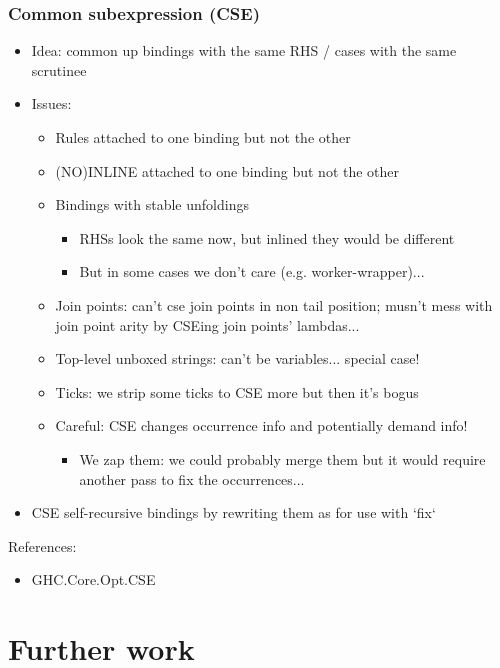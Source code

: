 \documentclass[aspectratio=169]{beamer}
\begin{document}
\begin{frame}
  \frametitle{Common subexpression (CSE)}

  \begin{itemize}
    \item Idea: common up bindings with the same RHS / cases with the same
      scrutinee
    \item Issues:
      \begin{itemize}
        \item Rules attached to one binding but not the other
        \item (NO)INLINE attached to one binding but not the other
        \item Bindings with stable unfoldings
          \begin{itemize}
            \item RHSs look the same now, but inlined they would be different
            \item But in some cases we don't care (e.g. worker-wrapper)...
          \end{itemize}
        \item Join points: can't cse join points in non tail position; musn't
          mess with join point arity by CSEing join points' lambdas...
        \item Top-level unboxed strings: can't be variables... special case!
        \item Ticks: we strip some ticks to CSE more but then it's bogus
        \item Careful: CSE changes occurrence info and potentially demand info!
          \begin{itemize}
            \item We zap them: we could probably merge them but it would require
              another pass to fix the occurrences...
          \end{itemize}
      \end{itemize}
    \item CSE self-recursive bindings by rewriting them as for use with `fix`
  \end{itemize}

  References:
  \begin{itemize}
    \item GHC.Core.Opt.CSE
  \end{itemize}
\end{frame}

\section{Further work}
\end{document}

